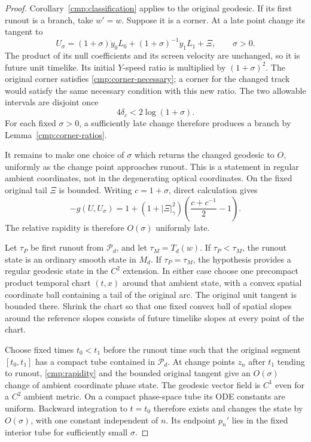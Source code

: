 \begin{proof}
Corollary~\ref{cmp:classification} applies to the original geodesic.
If its first runout is a branch, take $w'=w$. Suppose it is a corner.
At a late point change its tangent to
\begin{equation}\label{cmp:reciprocal-change}
 U_\sigma=(1+\sigma)\dot y_0L_0
           +(1+\sigma)^{-1}\dot y_1L_1+\Xi,
 \qquad \sigma>0.
\end{equation}
The product of its null coefficients and its screen velocity are
unchanged, so it is future unit timelike. Its initial $Y$-speed ratio
is multiplied by $(1+\sigma)^2$. The original corner satisfies
\eqref{cmp:corner-necessary}; a corner for the changed track would
satisfy the same necessary condition with this new ratio. The two
allowable intervals are disjoint once
\begin{equation}\label{cmp:corner-exclusion}
 4\delta_c<2\log(1+\sigma).
\end{equation}
For each fixed $\sigma>0$, a sufficiently late change therefore
produces a branch by Lemma~\ref{cmp:corner-ratios}.

It remains to make one choice of $\sigma$ which returns the changed
geodesic to $O$, uniformly as the change point approaches runout. This
is a statement in regular ambient coordinates, not in the degenerating
optical coordinates. On the fixed original tail $\Xi$ is bounded.
Writing $c=1+\sigma$, direct calculation gives
\begin{equation}\label{cmp:rapidity}
 -g(U,U_\sigma)
 =1+(1+|\Xi|_\gamma^2)
                    \left(\frac{c+c^{-1}}2-1\right).
\end{equation}
The relative rapidity is therefore $O(\sigma)$ uniformly late.

Let $\tau_P$ be first runout from $\mathcal P_d$, and let
$\tau_M=T_d(w)$. If $\tau_P<\tau_M$, the runout state is an
ordinary smooth state in $M_d$. If $\tau_P=\tau_M$, the hypothesis
provides a regular geodesic state in the $C^2$ extension. In either
case choose one precompact product temporal chart $(t,x)$ around that
ambient state, with a convex spatial coordinate ball containing a tail
of the original arc. The original unit tangent is bounded there.
Shrink the chart so that one fixed convex ball of spatial slopes around
the reference slopes consists of future timelike slopes at every point
of the chart.

Choose fixed times $t_0<t_1$ before the runout time such that the
original segment $[t_0,t_1]$ has a compact tube contained in
$\mathcal P_d$. At change points $z_n$ after $t_1$ tending to runout,
\eqref{cmp:rapidity} and the bounded original tangent give an
$O(\sigma)$ change of ambient coordinate phase state. The geodesic
vector field is $C^1$ even for a $C^2$ ambient metric. On a compact
phase-space tube its ODE constants are uniform. Backward integration to
$t=t_0$ therefore exists and changes the state by $O(\sigma)$, with
one constant independent of $n$. Its endpoint $p_n'$ lies in the
fixed interior tube for sufficiently small $\sigma$.


\end{proof}
